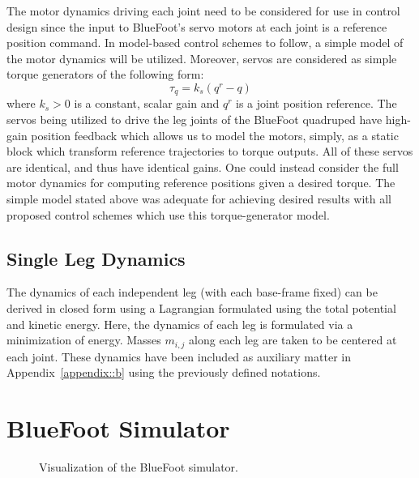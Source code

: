 			The motor dynamics driving each joint need to be considered for use in control design since the input to BlueFoot's servo motors at each joint is a reference position command. In model-based control schemes to follow, a simple model of the motor dynamics will be utilized. Moreover, servos are considered as simple torque generators of the following form:
				\begin{equation}
					\tau_{q} = k_{s}(q^{r}-q)
					\label{eq::servo_control_dynamics}
				\end{equation}
			where $k_{s}>0$ is a constant, scalar gain and $q^{r}$ is a joint position reference. The servos being utilized to drive the leg joints of the BlueFoot quadruped have high-gain position feedback which allows us to model the motors, simply, as a static block which transform reference trajectories to torque outputs. All of these servos are identical, and thus have identical gains. One could instead consider the full motor dynamics for computing reference positions given a desired torque. The simple model stated above was adequate for achieving desired results with all proposed control schemes which use this torque-generator model.


		\subsection{Single Leg Dynamics}
			
			The dynamics of each independent leg (with each base-frame fixed) can be derived in closed form using a Lagrangian formulated using the total potential and kinetic energy. Here, the dynamics of each leg is formulated via a minimization of energy. Masses $m_{i,j}$ along each \Ith leg are taken to be centered at each \Jth joint. These dynamics have been included as auxiliary matter in Appendix~\ref{appendix::b} using the previously defined notations.


	\section{BlueFoot Simulator}

		\begin{figure}[h!]
			\centering
			\caption{Visualization of the BlueFoot simulator.}
			\label{fig::simulator_wide}
		\end{figure}

